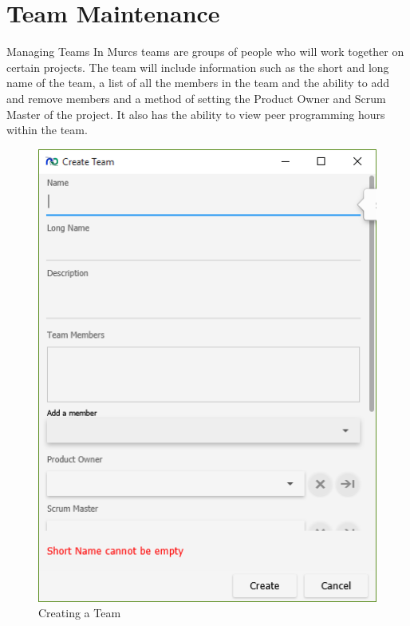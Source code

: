 \section{Team Maintenance}

Managing Teams
\newline\newline
In Murcs teams are groups of people who will work together on certain projects. The team will include information such as the short and long name of the team, a list of all the members in the team and the ability to add and remove members and a method of setting the Product Owner and Scrum Master of the project. It also has the ability to view peer programming hours within the team.
\newline

\begin{figure}[h]
	\centering
	\includegraphics[width=\textwidth]{images/screenshots/teams1.PNG}
	\caption{Creating a Team}
	\label{fig:new_project}
\end{figure}

